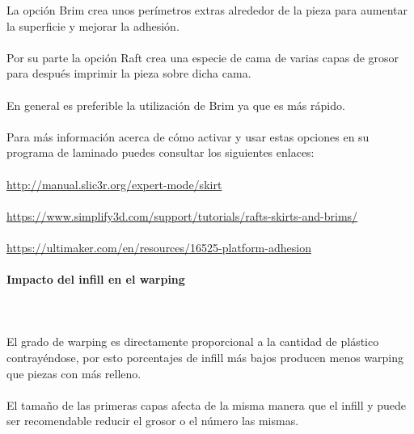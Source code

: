 \documentclass[11pt,a4paper]{article}
\begin{document}
La opción Brim crea unos perímetros extras alrededor de la pieza para aumentar la superficie y mejorar la adhesión.
\\\\
Por su parte la opción Raft crea una especie de cama de varias capas de grosor para después imprimir la pieza sobre dicha cama.
\\\\
En general es preferible la utilización de Brim ya que es más rápido.
\\\\
Para más información acerca de cómo activar y usar estas opciones en su programa de laminado puedes consultar los siguientes enlaces:\\\\
\url{http://manual.slic3r.org/expert-mode/skirt}\\\\
\url{https://www.simplify3d.com/support/tutorials/rafts-skirts-and-brims/}\\\\
\url{https://ultimaker.com/en/resources/16525-platform-adhesion}
			\paragraph{Impacto del infill en el warping}\mbox{}\\\\
El grado de warping es directamente proporcional a la cantidad de plástico contrayéndose, por esto porcentajes de infill más bajos producen menos warping que piezas con más relleno.
\\\\
El tamaño de las primeras capas afecta de la misma manera que el infill y puede ser recomendable reducir el grosor o el número las mismas.
\end{document}
